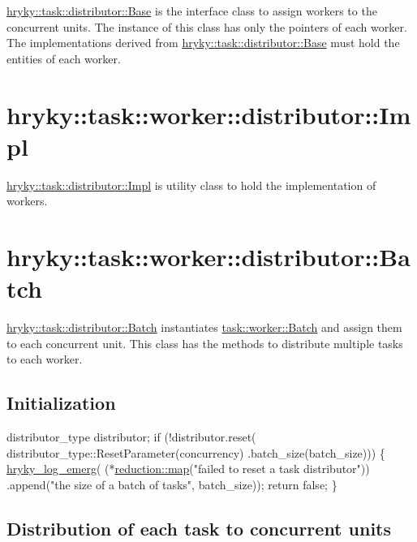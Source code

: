 \hyperlink{classhryky_1_1task_1_1distributor_1_1_base}{hryky\-::task\-::distributor\-::\-Base} is the interface class to assign workers to the concurrent units. The instance of this class has only the pointers of each worker. The implementations derived from \hyperlink{classhryky_1_1task_1_1distributor_1_1_base}{hryky\-::task\-::distributor\-::\-Base} must hold the entities of each worker.\hypertarget{hryky_1_1task_worker_distributor_Impl}{}\section{hryky\-::task\-::worker\-::distributor\-::\-Impl}\label{hryky_1_1task_worker_distributor_Impl}
\hyperlink{classhryky_1_1task_1_1distributor_1_1_impl}{hryky\-::task\-::distributor\-::\-Impl} is utility class to hold the implementation of workers.\hypertarget{hryky_1_1task_worker_distributor_Batch}{}\section{hryky\-::task\-::worker\-::distributor\-::\-Batch}\label{hryky_1_1task_worker_distributor_Batch}
\hyperlink{classhryky_1_1task_1_1distributor_1_1_batch}{hryky\-::task\-::distributor\-::\-Batch} instantiates \hyperlink{classhryky_1_1task_1_1worker_1_1_batch}{task\-::worker\-::\-Batch} and assign them to each concurrent unit. This class has the methods to distribute multiple tasks to each worker.

\hypertarget{hryky_1_1task_Initialization}{}\subsection{Initialization}\label{hryky_1_1task_Initialization}

\begin{DoxyCodeInclude}
    distributor\_type distributor;
    \textcolor{keywordflow}{if} (!distributor.reset(
        distributor\_type::ResetParameter(concurrency)
        .batch\_size(batch\_size)))
    \{
        \hyperlink{log__writer__common_8h_a8d142be5e91677a27be199c3f4115ba6}{hryky_log_emerg}(
            (*\hyperlink{namespacehryky_1_1reduction_ac5eae270cf8047b294dc4ff3e5e11a79}{reduction::map}(\textcolor{stringliteral}{"failed to reset a task distributor"}))
            .append(\textcolor{stringliteral}{"the size of a batch of tasks"}, batch\_size));
        \textcolor{keywordflow}{return} \textcolor{keyword}{false};
    \}

\end{DoxyCodeInclude}
\hypertarget{hryky_1_1task_Distribution}{}\subsection{Distribution of each task to concurrent units}\label{hryky_1_1task_Distribution}

